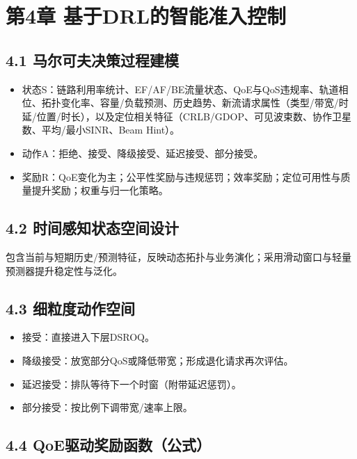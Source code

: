 \section{第4章
基于DRL的智能准入控制}\label{ux7b2c4ux7ae0-ux57faux4e8edrlux7684ux667aux80fdux51c6ux5165ux63a7ux5236}

\subsection{4.1
马尔可夫决策过程建模}\label{ux9a6cux5c14ux53efux592bux51b3ux7b56ux8fc7ux7a0bux5efaux6a21}

\begin{itemize}
\tightlist
\item
  状态S：链路利用率统计、EF/AF/BE流量状态、QoE与QoS违规率、轨道相位、拓扑变化率、容量/负载预测、历史趋势、新流请求属性（类型/带宽/时延/位置/时长），以及定位相关特征（CRLB/GDOP、可见波束数、协作卫星数、平均/最小SINR、Beam
  Hint）。
\item
  动作A：拒绝、接受、降级接受、延迟接受、部分接受。
\item
  奖励R：QoE变化为主；公平性奖励与违规惩罚；效率奖励；定位可用性与质量提升奖励；权重与归一化策略。
\end{itemize}

\subsection{4.2
时间感知状态空间设计}\label{ux65f6ux95f4ux611fux77e5ux72b6ux6001ux7a7aux95f4ux8bbeux8ba1}

包含当前与短期历史/预测特征，反映动态拓扑与业务演化；采用滑动窗口与轻量预测器提升稳定性与泛化。

\subsection{4.3
细粒度动作空间}\label{ux7ec6ux7c92ux5ea6ux52a8ux4f5cux7a7aux95f4}

\begin{itemize}
\tightlist
\item
  接受：直接进入下层DSROQ。
\item
  降级接受：放宽部分QoS或降低带宽；形成退化请求再次评估。
\item
  延迟接受：排队等待下一个时窗（附带延迟惩罚）。
\item
  部分接受：按比例下调带宽/速率上限。
\end{itemize}

\subsection{4.4
QoE驱动奖励函数（公式）}\label{qoeux9a71ux52a8ux5956ux52b1ux51fdux6570ux516cux5f0f}

